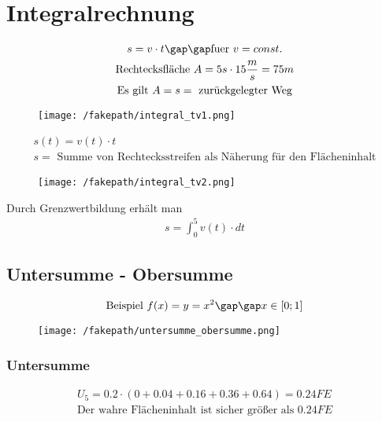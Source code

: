 \section{Integralrechnung}
\begin{gather*}
  s = v \cdot t \gap\gap\text{fuer } v = const. \\
  \text{Rechtecksfläche } A = 5s \cdot 15\frac{m}{s} = 75m \\
  \text{Es gilt } A = s = \text{ zurückgelegter Weg}
\end{gather*}
\begin{figure}[H]
  \centering
  \texttt{[image: /fakepath/integral\_tv1.png]}
\end{figure}
\begin{gather*}
  s(t) = v(t) \cdot t \\
  s = \text{ Summe von Rechtecksstreifen als Näherung für den Flächeninhalt}
\end{gather*}
\begin{figure}[H]
  \centering
  \texttt{[image: /fakepath/integral\_tv2.png]}
\end{figure}
Durch Grenzwertbildung erhält man
\begin{gather*}
  s = \int_0^5 v(t) \cdot dt
\end{gather*}
\subsection{Untersumme - Obersumme}
\begin{gather*}
  \text{Beispiel } f(x) = y = x^2 \gap\gap x \in \left[0; 1\right]
\end{gather*}
\begin{figure}[H]
  \centering
  \texttt{[image: /fakepath/untersumme\_obersumme.png]}
\end{figure}
\subsubsection{Untersumme}
\begin{gather*}
  U_5 = 0.2 \cdot (0 + 0.04 + 0.16 + 0.36 + 0.64) = 0.24FE \\
  \text{Der wahre Flächeninhalt ist sicher größer als } 0.24FE
\end{gather*}
